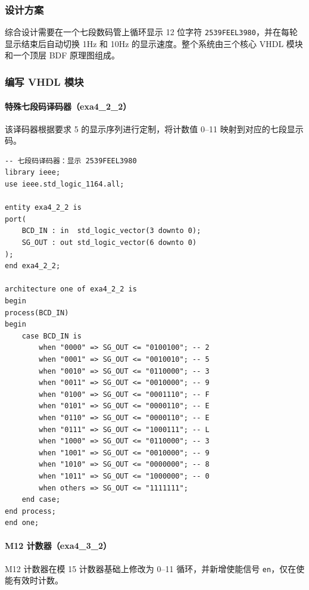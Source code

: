 \documentclass{ctexrep}
\begin{document}
\subsubsection{设计方案}

综合设计需要在一个七段数码管上循环显示 12 位字符 \texttt{2539FEEL3980}，并在每轮显示结束后自动切换 1Hz 和 10Hz 的显示速度。整个系统由三个核心 VHDL 模块和一个顶层 BDF 原理图组成。

\subsubsection{编写 VHDL 模块}

\paragraph{特殊七段码译码器（exa4\_2\_2）}

该译码器根据要求 5 的显示序列进行定制，将计数值 0--11 映射到对应的七段显示码。

\begin{verbatim}
-- 七段码译码器：显示 2539FEEL3980
library ieee;
use ieee.std_logic_1164.all;

entity exa4_2_2 is
port(
    BCD_IN : in  std_logic_vector(3 downto 0);
    SG_OUT : out std_logic_vector(6 downto 0)
);
end exa4_2_2;

architecture one of exa4_2_2 is
begin
process(BCD_IN)
begin
    case BCD_IN is
        when "0000" => SG_OUT <= "0100100"; -- 2
        when "0001" => SG_OUT <= "0010010"; -- 5
        when "0010" => SG_OUT <= "0110000"; -- 3
        when "0011" => SG_OUT <= "0010000"; -- 9
        when "0100" => SG_OUT <= "0001110"; -- F
        when "0101" => SG_OUT <= "0000110"; -- E
        when "0110" => SG_OUT <= "0000110"; -- E
        when "0111" => SG_OUT <= "1000111"; -- L
        when "1000" => SG_OUT <= "0110000"; -- 3
        when "1001" => SG_OUT <= "0010000"; -- 9
        when "1010" => SG_OUT <= "0000000"; -- 8
        when "1011" => SG_OUT <= "1000000"; -- 0
        when others => SG_OUT <= "1111111";
    end case;
end process;
end one;
\end{verbatim}
\label{e4:lst:decoder2}

\paragraph{M12 计数器（exa4\_3\_2）}

M12 计数器在模 15 计数器基础上修改为 0--11 循环，并新增使能信号 \texttt{en}，仅在使能有效时计数。
\end{document}
